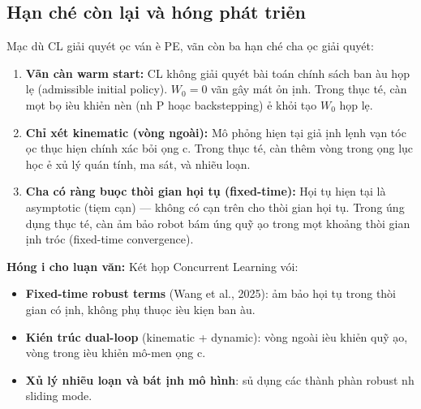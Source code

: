 \documentclass[12pt,a4paper]{article}
\begin{document}
\subsection{H\d{a}n ch\'{e} c\`{o}n l\d{a}i v\`{a} h\uhorn{}\'{o}ng ph\'{a}t tri\h{e}n}

M\d{a}c d\`{u} CL gi\h{a}i quy\'{e}t \dj\uhorn{}\d{o}c v\'{a}n \dj\`{e} PE, v\~{a}n c\`{o}n ba h\d{a}n ch\'{e} ch\uhorn{}a \dj\uhorn{}\d{o}c gi\h{a}i quy\'{e}t:

\begin{enumerate}
    \item \textbf{V\~{a}n c\`{a}n warm start:} CL kh\^{o}ng gi\h{a}i quy\'{e}t b\`{a}i to\'{a}n ch\'{i}nh s\'{a}ch ban \dj\`{a}u h\d{o}p l\d{e} (admissible initial policy). $W_0 = 0$ v\~{a}n g\^{a}y m\'{a}t \h{o}n \dj\d{i}nh. Trong th\d{u}c t\'{e}, c\`{a}n m\d{o}t b\d{o} \dj i\`{e}u khi\h{e}n n\`{e}n (nh\uhorn{} P ho\d{a}c backstepping) \dj\h{e} kh\h{o}i t\d{a}o $W_0$ h\d{o}p l\d{e}.

    \item \textbf{Ch\h{i} x\'{e}t kinematic (v\`{o}ng ngo\`{a}i):} M\^{o} ph\h{o}ng hi\d{e}n t\d{a}i gi\h{a} \dj\d{i}nh l\d{e}nh v\d{a}n t\'{o}c \dj\uhorn{}\d{o}c th\d{u}c hi\d{e}n ch\'{i}nh x\'{a}c b\h{o}i \dj\d{o}ng c\ohorn{}. Trong th\d{u}c t\'{e}, c\`{a}n th\^{e}m v\`{o}ng trong \dj\d{o}ng l\d{u}c h\d{o}c \dj\h{e} x\h{u} l\'{y} qu\'{a}n t\'{i}nh, ma s\'{a}t, v\`{a} nhi\~{e}u lo\d{a}n.

    \item \textbf{Ch\uhorn{}a c\'{o} r\`{a}ng bu\d{o}c th\`{o}i gian h\d{o}i t\d{u} (fixed-time):} H\d{o}i t\d{u} hi\d{e}n t\d{a}i l\`{a} asymptotic (ti\d{e}m c\d{a}n) --- kh\^{o}ng c\'{o} c\d{a}n tr\^{e}n cho th\`{o}i gian h\d{o}i t\d{u}. Trong \'{u}ng d\d{u}ng th\d{u}c t\'{e}, c\`{a}n \dj\h{a}m b\h{a}o robot b\'{a}m \dj\'{u}ng qu\~{y} \dj\d{a}o trong m\d{o}t kho\h{a}ng th\`{o}i gian \dj\d{i}nh tr\uhorn{}\'{o}c (fixed-time convergence).
\end{enumerate}

\textbf{H\uhorn{}\'{o}ng \dj i cho lu\d{a}n v\u{a}n:} K\'{e}t h\d{o}p Concurrent Learning v\'{o}i:
\begin{itemize}[nosep]
    \item \textbf{Fixed-time robust terms} (Wang et al., 2025): \dj\h{a}m b\h{a}o h\d{o}i t\d{u} trong th\`{o}i gian c\'{o} \dj\d{i}nh, kh\^{o}ng ph\d{u} thu\d{o}c \dj i\`{e}u ki\d{e}n ban \dj\`{a}u.
    \item \textbf{Ki\'{e}n tr\'{u}c dual-loop} (kinematic + dynamic): v\`{o}ng ngo\`{a}i \dj i\`{e}u khi\h{e}n qu\~{y} \dj\d{a}o, v\`{o}ng trong \dj i\`{e}u khi\h{e}n m\^{o}-men \dj\d{o}ng c\ohorn{}.
    \item \textbf{X\h{u} l\'{y} nhi\~{e}u lo\d{a}n v\`{a} b\'{a}t \dj\d{i}nh m\^{o} h\`{i}nh}: s\h{u} d\d{u}ng c\'{a}c th\`{a}nh ph\`{a}n robust nh\uhorn{} sliding mode.
\end{itemize}
\end{document}
